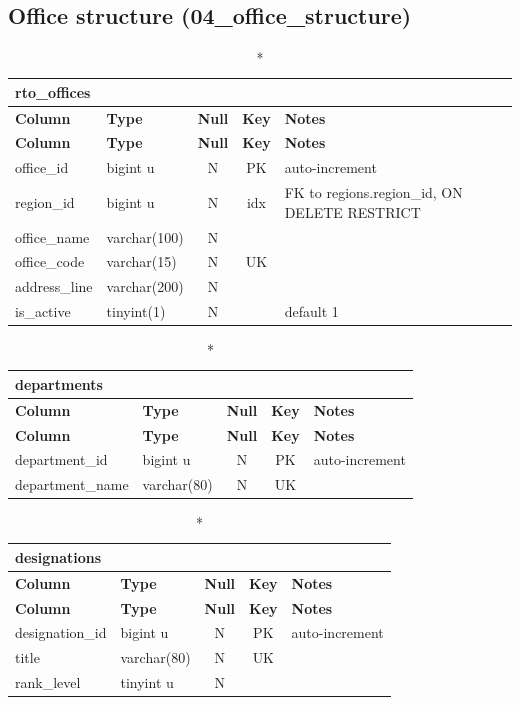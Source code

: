 \subsection*{Office structure (04\_office\_structure)}
\begin{longtable}{@{}p{3.4cm}p{2.9cm}c c p{5.6cm}@{}}
\caption*{\textbf{rto\_\allowbreak{}offices}}\\
\toprule \textbf{Column} & \textbf{Type} & \textbf{Null} & \textbf{Key} & \textbf{Notes} \\ \midrule \endfirsthead
\toprule \textbf{Column} & \textbf{Type} & \textbf{Null} & \textbf{Key} & \textbf{Notes} \\ \midrule \endhead
\bottomrule \endlastfoot
office\_\allowbreak{}id & bigint u & N & PK & auto-increment \\
region\_\allowbreak{}id & bigint u & N & idx & FK to regions.region\_\allowbreak{}id, ON DELETE RESTRICT \\
office\_\allowbreak{}name & varchar(100) & N &  &  \\
office\_\allowbreak{}code & varchar(15) & N & UK &  \\
address\_\allowbreak{}line & varchar(200) & N &  &  \\
is\_\allowbreak{}active & tinyint(1) & N &  & default 1 \\
\end{longtable}
\vspace{-0.4em}
\begin{longtable}{@{}p{3.4cm}p{2.9cm}c c p{5.6cm}@{}}
\caption*{\textbf{departments}}\\
\toprule \textbf{Column} & \textbf{Type} & \textbf{Null} & \textbf{Key} & \textbf{Notes} \\ \midrule \endfirsthead
\toprule \textbf{Column} & \textbf{Type} & \textbf{Null} & \textbf{Key} & \textbf{Notes} \\ \midrule \endhead
\bottomrule \endlastfoot
department\_\allowbreak{}id & bigint u & N & PK & auto-increment \\
department\_\allowbreak{}name & varchar(80) & N & UK &  \\
\end{longtable}
\vspace{-0.4em}
\begin{longtable}{@{}p{3.4cm}p{2.9cm}c c p{5.6cm}@{}}
\caption*{\textbf{designations}}\\
\toprule \textbf{Column} & \textbf{Type} & \textbf{Null} & \textbf{Key} & \textbf{Notes} \\ \midrule \endfirsthead
\toprule \textbf{Column} & \textbf{Type} & \textbf{Null} & \textbf{Key} & \textbf{Notes} \\ \midrule \endhead
\bottomrule \endlastfoot
designation\_\allowbreak{}id & bigint u & N & PK & auto-increment \\
title & varchar(80) & N & UK &  \\
rank\_\allowbreak{}level & tinyint u & N &  &  \\
\end{longtable}
